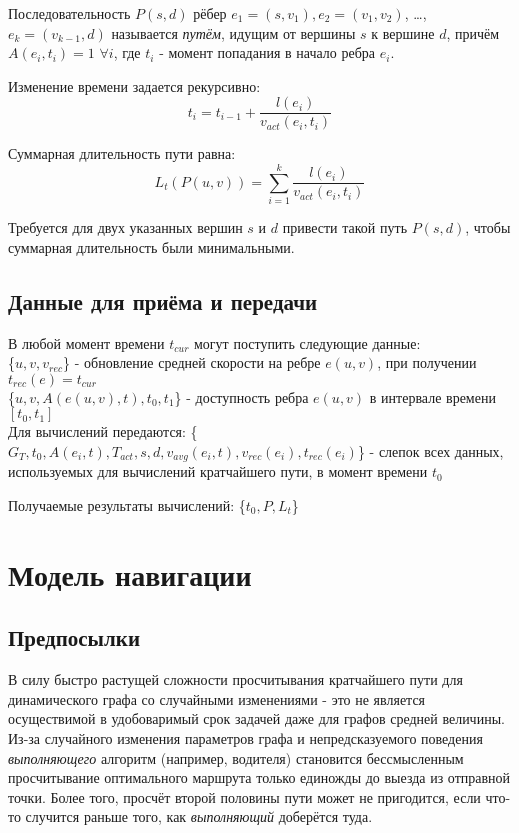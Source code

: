 \documentclass[12pt]{article}
\begin{document}
Последовательность $P(s,d)$ рёбер $e_1=(s,v_1), e_2=(v_1,v_2)$, …, $e_k=(v_{k-1},d)$ называется \textit{путём}, идущим от вершины $s$ к вершине $d$, причём $A(e_i,t_i)=1$ $\forall i$, где $t_i$ - момент попадания в начало ребра $e_i$.

Изменение времени задается рекурсивно:
$$t_i = t_{i-1} + \frac{l(e_i)}{v_{act}(e_i,t_i)}$$

Суммарная длительность пути равна:
$$L_t(P(u,v)) = \sum_{i = 1}^k \frac{l(e_i)}{v_{act}(e_i,t_i)}$$

Требуется для двух указанных вершин $s$ и $d$ привести такой путь $P(s,d)$, чтобы суммарная длительность были минимальными.

\subsection{Данные для приёма и передачи}

В любой момент времени $t_{cur}$ могут поступить следующие данные: \\
\{$u,v,v_{rec}$\} - обновление средней скорости на ребре $e(u,v)$, при получении $t_{rec}(e) = t_{cur}$ \\
\{$u,v,A(e(u,v),t),t_0,t_1$\} - доступность ребра $e(u,v)$ в интервале времени $[t_0,t_1]$ \\

Для вычислений передаются:
\{$G_T,t_0,A(e_i,t),T_{act},s,d,v_{avg}(e_i,t),v_{rec}(e_i),t_{rec}(e_i)$\} - слепок всех данных, используемых для вычислений кратчайшего пути, в момент времени $t_0$

Получаемые результаты вычислений:
\{$t_0,P,L_t$\}

\section{Модель навигации}

\subsection{Предпосылки}

В силу быстро растущей сложности просчитывания кратчайшего пути для динамического графа со случайными изменениями - это не является осуществимой в удобоваримый срок задачей даже для графов средней величины. Из-за случайного изменения параметров графа и непредсказуемого поведения \textit{выполняющего} алгоритм (например, водителя) становится бессмысленным просчитывание оптимального маршрута только единожды до выезда из отправной точки. Более того, просчёт второй половины пути может не пригодится, если что-то случится раньше того, как \textit{выполняющий} доберётся туда.
\end{document}
